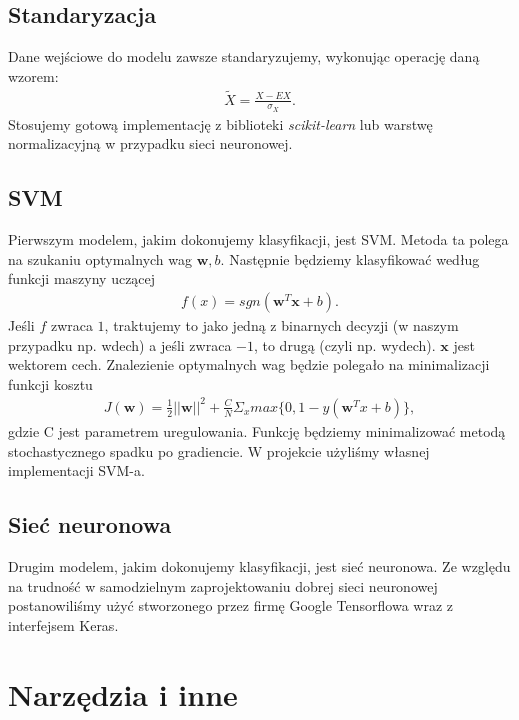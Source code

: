 \documentclass[polish]{article}
\begin{document}
\subsection{Standaryzacja}
Dane wejściowe do modelu zawsze standaryzujemy, wykonując operację daną wzorem:
\begin{gather*}
	\tilde X = \frac{X - EX}{\sigma_X}.
\end{gather*}
Stosujemy gotową implementację z biblioteki \textit{scikit-learn} lub warstwę normalizacyjną w przypadku sieci neuronowej.
\subsection{SVM}
Pierwszym modelem, jakim dokonujemy klasyfikacji, jest SVM. Metoda ta polega na szukaniu optymalnych wag $\boldsymbol{w}, b$.
Następnie będziemy klasyfikować według funkcji maszyny uczącej 
\begin{gather*}
	f(x) = sgn(\boldsymbol{w}^T \boldsymbol{x} + b).
\end{gather*}
Jeśli $f$ zwraca $1$, traktujemy to jako jedną z binarnych decyzji (w naszym przypadku np. wdech) a jeśli zwraca $-1$, to drugą (czyli np. wydech).
$\textbf{x}$ jest wektorem cech.  Znalezienie optymalnych wag będzie polegało na minimalizacji
funkcji kosztu
\begin{gather*}
	J(\boldsymbol{w}) = \frac{1}{2}||\boldsymbol{w}||^2 + \frac{C}{N}\Sigma_x max\{0, 1 - y(\boldsymbol{w}^Tx + b)\},
\end{gather*}
gdzie C jest parametrem uregulowania. Funkcję będziemy minimalizować metodą stochastycznego spadku po gradiencie.
W projekcie użyliśmy własnej implementacji SVM-a.
\subsection{Sieć neuronowa}
Drugim modelem, jakim dokonujemy klasyfikacji, jest sieć neuronowa. Ze względu na trudność w samodzielnym zaprojektowaniu dobrej sieci neuronowej postanowiliśmy użyć stworzonego przez firmę Google Tensorflowa wraz z interfejsem Keras. 
\section{Narzędzia i inne}
\end{document}
